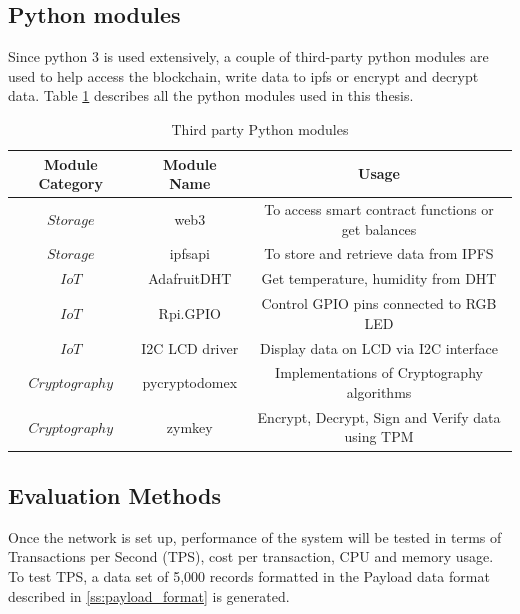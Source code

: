 \documentclass[11pt,openright]{report}
\begin{document}
\subsection{Python modules}
Since python 3 is used extensively, a couple of third-party python modules are used to help access the blockchain, write data to ipfs or encrypt and decrypt data.
Table \ref{python_modules} describes all the python modules used in this thesis.
\newline
\newline
\begin{table}[!htbp]
    \renewcommand{\arraystretch}{1.3}
    \caption{Third party Python modules}
    \label{python_modules}
    \centering
    \begin{tabular}{|c|c|c|}
        \hline
        \bfseries Module Category & \bfseries Module Name & \bfseries Usage \\
        \hline\hline
        $Storage$ & web3 & To access smart contract functions or get balances \\ \hline
        $Storage$ & ipfsapi & To store and retrieve data from IPFS \\ \hline
        $IoT$ & AdafruitDHT & Get temperature, humidity from DHT \\ \hline
        $IoT$ & Rpi.GPIO & Control GPIO pins connected to RGB LED \\ \hline
        $IoT$ & I2C LCD driver & Display data on LCD via I2C interface \\ \hline
        $Cryptography$ & pycryptodomex & Implementations of Cryptography algorithms \\ \hline
        $Cryptography$ & zymkey & Encrypt, Decrypt, Sign and Verify data using TPM \\ \hline
    \end{tabular}
\end{table}
\newline
\newline
\subsection{Evaluation Methods}
Once the network is set up, performance of the system will be tested in terms of Transactions per Second (TPS), cost per transaction, CPU and memory usage. To test TPS, a data set of 5,000 records formatted in the Payload data format described in \ref{ss:payload_format} is generated.
\end{document}
